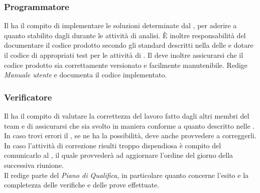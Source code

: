 \subsubsection{Programmatore}
Il \Programmatore{} ha il compito di implementare le soluzioni determinate dal \Progettista, per aderire a quanto stabilito dagli \Analisti{} durante le attività di analisi. \`{E} inoltre responsabilità del \Programmatore{} documentare il codice prodotto secondo gli standard descritti nella  delle \NormeDiProgetto{} e dotare il codice di appropriati test per le attività di \VV. Il \Programmatore{} deve inoltre assicurarsi che il codice prodotto sia correttamente versionato e facilmente manutenibile.
Redige \textit{Manuale utente} e documenta il codice implementato.

\subsubsection{Verificatore}
Il \Verificatore{} ha il compito di valutare la correttezza del lavoro fatto dagli altri membri del team e di assicurarsi che sia svolto in maniera conforme a quanto descritto nelle \NormeDiProgetto. In caso trovi errori il \Verificatore, se ne ha la possibilità, deve anche provvedere a correggerli. In caso l'attività di correzione risulti troppo dispendiosa è compito del \Verificatore{} comunicarlo al \Responsabile, il quale provvederà ad aggiornare l'ordine del giorno della successiva riunione.\\
Il \Verificatore{} redige parte del \textit{Piano di Qualifica}, in particolare quanto concerne l'esito e la completezza delle verifiche e delle prove effettuate.

